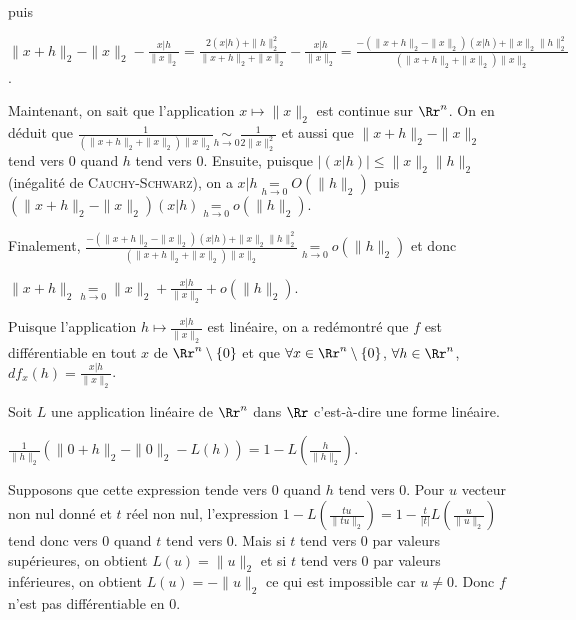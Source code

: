 {{puis

\begin{center}
$\|x+h\|_2-\|x\|_2- \frac{x|h}{\|x\|_2}= \frac{2(x|h)+\|h\|_2^2}{\|x+h\|_2+\|x\|_2}- \frac{x|h}{\|x\|_2}= \frac{-\left(\|x+h\|_2-\|x\|_2\right)(x|h)+\|x\|_2\|h\|_2^2}{\left(\|x+h\|_2+\|x\|_2\right)\|x\|_2}$.
\end{center}

Maintenant, on sait que l'application $x\mapsto\|x\|_2$ est continue sur $\Rr^n$. On en déduit que $ \frac{1}{\left(\|x+h\|_2+\|x\|_2\right)\|x\|_2}\underset{h\rightarrow0}{\sim} \frac{1}{2\|x\|_2^2}$ et aussi que $\|x+h\|_2-\|x\|_2$ tend vers $0$ quand $h$ tend vers $0$. Ensuite, puisque $\left|(x|h)\right|\leqslant\|x\|_2\|h\|_2$ (inégalité de \textsc{Cauchy}-\textsc{Schwarz}), on a $x|h\underset{h\rightarrow0}{=}O(\|h\|_2)$ puis $\left(\|x+h\|_2-\|x\|_2\right)\left(x|h\right)\underset{h\rightarrow0}{=}o(\|h\|_2)$.

Finalement, $ \frac{-\left(\|x+h\|_2-\|x\|_2\right)(x|h)+\|x\|_2\|h\|_2^2}{\left(\|x+h\|_2+\|x\|_2\right)\|x\|_2}\underset{h\rightarrow0}{=}o(\|h\|_2)$ et donc

\begin{center}
$\|x+h\|_2\underset{h\rightarrow0}{=}\|x\|_2+ \frac{x|h}{\|x\|_2}+o(\|h\|_2)$.
\end{center}

Puisque l'application $h\mapsto \frac{x|h}{\|x\|_2}$ est linéaire, on a redémontré que $f$ est différentiable en tout $x$ de $\Rr^n\setminus\{0\}$ et que $\forall x\in\Rr^n\setminus\{0\}$, $\forall h\in\Rr^n$, $df_x(h)= \frac{x|h}{\|x\|_2}$.

Soit $L$ une application linéaire de $\Rr^n$ dans $\Rr$ c'est-à-dire une forme linéaire.

\begin{center}
$ \frac{1}{\|h\|_2}\left(\|0+h\|_2-\|0\|_2-L(h)\right)=1-L\left( \frac{h}{\|h\|_2}\right)$.
\end{center}

Supposons que cette expression tende vers $0$ quand $h$ tend vers $0$. Pour $u$ vecteur non nul donné et $t$ réel non nul, l'expression $1-L\left( \frac{tu}{\|tu\|_2}\right)=1- \frac{t}{|t|}L\left( \frac{u}{\|u\|_2}\right)$ tend donc vers $0$ quand $t$ tend vers $0$. Mais si $t$ tend vers $0$ par valeurs supérieures, on obtient $L(u)=\|u\|_2$ et si $t$ tend vers $0$ par valeurs inférieures, on obtient $L(u)=-\|u\|_2$ ce qui est impossible car $u\neq0$. Donc $f$ n'est pas différentiable en $0$.
}
}
